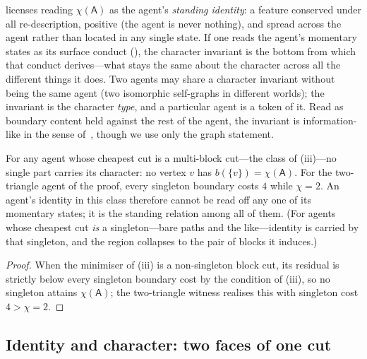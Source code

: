 \documentclass[11pt,twocolumn,a4paper]{article}
\newcommand{\Agent}{\mathsf{A}}
\newcommand{\Char}{\chi}             %
\begin{document}
\begin{remark}
\label{rem:character}
 licenses reading $\Char(\Agent)$ as the agent's
\emph{standing identity}: a feature conserved under all re-description,
positive (the agent is never nothing), and spread across the agent rather
than located in any single state. If one reads the agent's momentary
states as its surface conduct (), the character
invariant is the bottom from which that conduct derives---what stays the
same about the character across all the different things it does. Two
agents may share a character invariant without being the same agent (two
isomorphic self-graphs in different worlds); the invariant is the
character \emph{type}, and a particular agent is a token of it. Read as
boundary content held against the rest of the agent, the invariant is
information-like in the sense of~\cite{shannon1948,coverthomas2006}, though
we use only the graph statement.
\end{remark}

\begin{corollary}
\label{cor:not-a-state}
For any agent whose cheapest cut is a multi-block cut---the class of
(iii)---no single part carries its character: no vertex
$v$ has $b(\{v\})=\Char(\Agent)$. For the two-triangle agent of the proof,
every singleton boundary costs $4$ while $\Char=2$. An agent's identity in
this class therefore cannot be read off any one of its momentary states; it
is the standing relation among all of them. (For agents whose cheapest cut
\emph{is} a singleton---bare paths and the like---identity is carried by
that singleton, and the region collapses to the pair of blocks it induces.)
\end{corollary}

\begin{proof}
When the minimiser of (iii) is a non-singleton block
cut, its residual is strictly below every singleton boundary cost by the
condition of (iii), so no singleton attains $\Char(\Agent)$; the
two-triangle witness realises this with singleton cost $4>\Char=2$.
\end{proof}

\subsection{Identity and character: two faces of one cut}
\label{sec:idchar}
\end{document}
